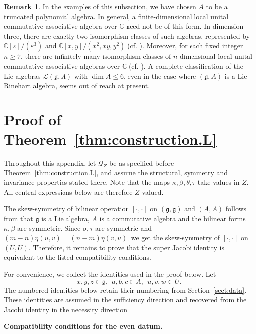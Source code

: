 \documentclass[12pt]{article}
\numberwithin{equation}{section}
\theoremstyle{definition}
\newtheorem{remark}[theorem]{Remark}
\theoremstyle{plain}
\newcommand{\bC}{\ensuremath{\mathbb{C}}}
\newcommand{\fg}{\mathfrak{g}}
\newcommand{\cQ}{\ensuremath{\mathcal{Q}}}
\newcommand{\cL}{\ensuremath{\mathcal{L}}}
\begin{document}
\begin{remark}
    In the examples of this subsection, we have chosen $A$ to be a truncated polynomial algebra. In general, a finite-dimensional local unital commutative associative algebra over $\bC$ need not be of this form. In dimension three, there are exactly two isomorphism classes of such algebras, represented by $\bC[\varepsilon]/(\varepsilon^3)$ and $\bC[x,y]/(x^2,xy,y^2)$ (cf. \cite{Poonen}). Moreover, for each fixed integer $n\ge7$, there are infinitely many isomorphism classes of $n$-dimensional local unital commutative associative algebras over $\bC$ (cf. \cite{Poonen,S}). A complete classification of the Lie algebras $\cL(\fg,A)$ with $\dim A\le 6$, even in the case where $(\fg,A)$ is a Lie--Rinehart algebra, seems out of reach at present.
\end{remark}







\appendix

\section{Proof of Theorem~\ref{thm:construction.L}}\label{app:Jacobi}
\hspace{1.5em}Throughout this appendix, let $\cQ_Z$ be as specified before Theorem~\ref{thm:construction.L}, and assume the structural, symmetry and invariance
properties stated there. Note that the maps $\kappa,\beta,\theta,\tau$ take values in $Z$. All central expressions below are therefore $Z$-valued.

The skew-symmetry of bilinear operation $[\cdot,\cdot]$ on $(\fg,\fg)$ and $(A,A)$ follows from that $\fg$ is a Lie algebra, $A$ is a commutative algebra and the bilinear forms $\kappa,\beta$ are symmetric. Since $\sigma,\tau$ are symmetric and $(m-n)\eta(u,v)=(n-m)\eta(v,u)$, we get the skew-symmetry of $[\cdot,\cdot]$ on $(U,U)$. Therefore, it remains to prove that the super Jacobi identity is equivalent to the listed compatibility conditions.

For convenience, we collect the identities used in the proof below. Let
\[
    x,y,z\in\fg,\ \ a,b,c\in A,\ \ u,v,w\in U.
\]
The numbered identities below retain their numbering from Section~\ref{sect:data}. These identities are assumed in the sufficiency direction and recovered from the Jacobi identity in the necessity direction. 

\medskip
\noindent\textbf{Compatibility conditions for the even datum.}
\end{document}
